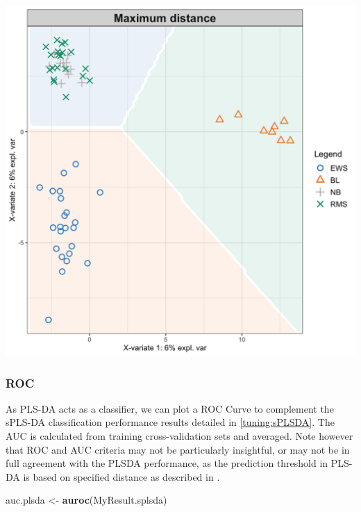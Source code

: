 \documentclass[]{book}
\newenvironment{Shaded}{\begin{snugshade}}{\end{snugshade}}
\newcommand{\KeywordTok}[1]{\textcolor[rgb]{0.13,0.29,0.53}{\textbf{#1}}}
\newcommand{\NormalTok}[1]{#1}
\newcommand{\StringTok}[1]{\textcolor[rgb]{0.31,0.60,0.02}{#1}}
\begin{document}
\begin{center}\includegraphics[width=0.75\linewidth,]{Figures/04-plsda-background-1} \end{center}

\hypertarget{roc}{%
\subsubsection{ROC}\label{roc}}

As PLS-DA acts as a classifier, we can plot a ROC Curve to complement the sPLS-DA classification performance results detailed in \ref{tuning:sPLSDA}. The AUC is calculated from training cross-validation sets and averaged. Note however that ROC and AUC criteria may not be particularly insightful, or may not be in full agreement with the PLSDA performance, as the prediction threshold in PLS-DA is based on specified distance as described in \citep{mixomics}.

\begin{Shaded}
\begin{Highlighting}[]
\NormalTok{auc.plsda <-}\StringTok{ }\KeywordTok{auroc}\NormalTok{(MyResult.splsda)}
\end{Highlighting}
\end{Shaded}
\end{document}
